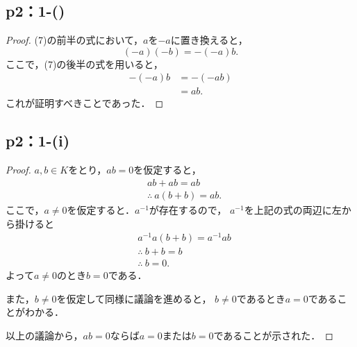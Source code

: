 \documentclass[a4paper,10pt,fleqn]{ltjsarticle}
\begin{document}
\subsection*{p2：1-()}

\begin{leftbar}
    \begin{proof}
        (7)の前半の式において，$a$を$-a$に置き換えると，
        \[
            (-a)(-b) = -(-a)b.
        \]
        ここで，(7)の後半の式を用いると，
        \begin{align*}
            -(-a)b & = -(-ab) \\
                   & = ab.
        \end{align*}
        これが証明すべきことであった．
    \end{proof}
\end{leftbar}


\subsection*{p2：1-(i)}

\begin{leftbar}
    \begin{proof}
        $ a, b \in K$をとり，$ab =0$を仮定すると，
        \begin{align*}
             & ab + ab = ab            \\
             & \therefore ~ a(b+b)=ab.
        \end{align*}
        ここで，$a \ne 0$を仮定すると．$a^{-1}$が存在するので，
        $a^{-1}$を上記の式の両辺に左から掛けると
        \begin{align*}
             & a^{-1}a(b+b)=a^{-1}ab \\
             & \therefore ~ b+b=b    \\
             & \therefore ~ b=0.
        \end{align*}
        よって$a \ne 0$のとき$b=0$である．

        また，$b \ne 0$を仮定して同様に議論を進めると，
        $b \ne 0$であるとき$ a=0$であることがわかる．

        以上の議論から，$ab=0$ならば$a=0$または$b=0$であることが示された．
    \end{proof}
\end{leftbar}
\end{document}
